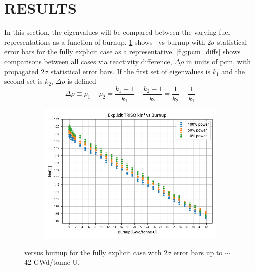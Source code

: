 \documentclass[letterpaper]{physor2024}
\begin{document}
\section{RESULTS}\label{sec:results}
In this section, the eigenvalues will be compared between the varying fuel representations as a function of burnup. \cref{fig:kinf_full_explicit_results} shows \kinf~vs burnup with $2\sigma$ statistical error bars for the fully explicit case as a representative. \cref{fig:pcm_diffs} shows comparisons between all cases via reactivity difference, $\Delta \rho$ in units of \gls{pcm}, with propagated $2\sigma$ statistical error bars. If the first set of eigenvalues is $k_ 1$ and the second set is  $k_2$, $\Delta \rho$ is defined
\begin{equation}
    \Delta \rho \equiv
    \rho_1 - \rho_2 =
    \frac{k_1-1}{k_1} - \frac{k_2 - 1 }{k_2} =
    \frac{1}{k_2} - \frac{1}{k_1}
\end{equation}
\vspace{-0.4cm}
\begin{figure}[!h]
    \centering
    \begin{subfigure}{0.6\linewidth}
        \centering
        \includegraphics[width=\linewidth]{figures/expl_kinf_vs_bu.png}
    \end{subfigure}
    \caption{\kinf versus burnup for the fully explicit case with $2\sigma$ error bars up to $\sim$42 GWd/tonne-U.}
    \label{fig:kinf_full_explicit_results}
\end{figure}
\end{document}
